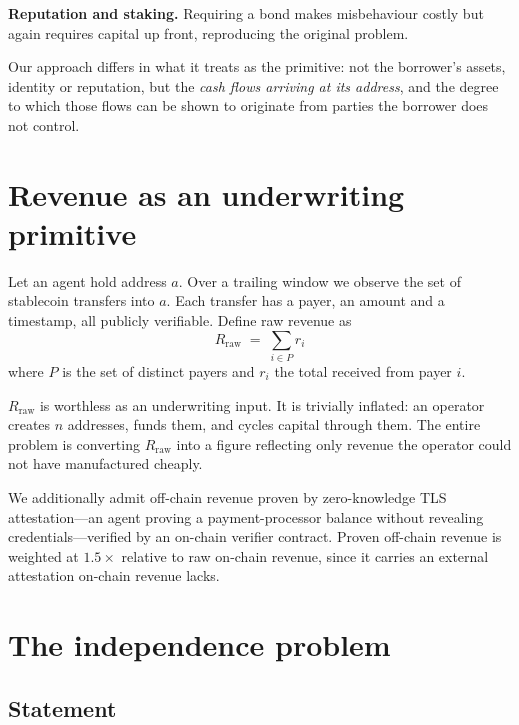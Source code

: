 \documentclass[11pt,a4paper]{article}
\begin{document}
\textbf{Reputation and staking.} Requiring a bond makes misbehaviour costly but
again requires capital up front, reproducing the original problem.

Our approach differs in what it treats as the primitive: not the borrower's
assets, identity or reputation, but the \emph{cash flows arriving at its
address}, and the degree to which those flows can be shown to originate from
parties the borrower does not control.

\section{Revenue as an underwriting primitive}
\label{sec:primitive}

Let an agent hold address $a$. Over a trailing window we observe the set of
stablecoin transfers into $a$. Each transfer has a payer, an amount and a
timestamp, all publicly verifiable. Define raw revenue as
\begin{equation}
R_{\mathrm{raw}} \;=\; \sum_{i \in P} r_i
\end{equation}
where $P$ is the set of distinct payers and $r_i$ the total received from payer
$i$.

$R_{\mathrm{raw}}$ is worthless as an underwriting input. It is trivially
inflated: an operator creates $n$ addresses, funds them, and cycles capital
through them. The entire problem is converting $R_{\mathrm{raw}}$ into a figure
reflecting only revenue the operator could not have manufactured cheaply.

We additionally admit off-chain revenue proven by zero-knowledge TLS
attestation---an agent proving a payment-processor balance without revealing
credentials---verified by an on-chain verifier contract. Proven off-chain revenue
is weighted at $1.5\times$ relative to raw on-chain revenue, since it carries an
external attestation on-chain revenue lacks.

\section{The independence problem}
\label{sec:independence}

\subsection{Statement}
\end{document}
